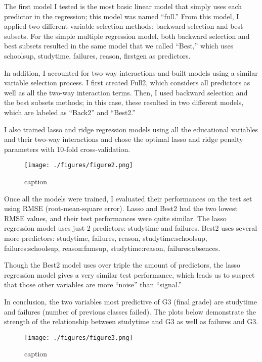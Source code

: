 \documentclass[
]{article}
\begin{document}
The first model I tested is the most basic linear model that simply uses
each predictor in the regression; this model was named ``full.'' From
this model, I applied two different variable selection methods: backward
selection and best subsets. For the simple multiple regression model,
both backward selection and best subsets resulted in the same model that
we called ``Best,'' which uses schoolsup, studytime, failures, reason,
firstgen as predictors.

In addition, I accounted for two-way interactions and built models using
a similar variable selection process. I first created Full2, which
considers all predictors as well as all the two-way interaction terms.
Then, I used backward selection and the best subsets methods; in this
case, these resulted in two different models, which are labeled as
``Back2'' and ``Best2.''

I also trained lasso and ridge regression models using all the
educational variables and their two-way interactions and chose the
optimal lasso and ridge penalty parameters with 10-fold
cross-validation.

\begin{figure}
\centering
\texttt{[image: ./figures/figure2.png]}
\caption{caption}
\end{figure}

Once all the models were trained, I evaluated their performances on the
test set using RMSE (root-mean-square error). Lasso and Best2 had the
two lowest RMSE values, and their test performances were quite similar.
The lasso regression model uses just 2 predictors: studytime and
failures. Best2 uses several more predictors: studytime, failures,
reason, studytime:schoolsup, failures:schoolsup, reason:famsup,
studytime:reason, failures:absences.

Though the Best2 model uses over triple the amount of predictors, the
lasso regression model gives a very similar test performance, which
leads us to suspect that those other variables are more ``noise'' than
``signal.''

In conclusion, the two variables most predictive of G3 (final grade) are
studytime and failures (number of previous classes failed). The plots
below demonstrate the strength of the relationship between studytime and
G3 as well as failures and G3.

\begin{figure}
\centering
\texttt{[image: ./figures/figure3.png]}
\caption{caption}
\end{figure}
\end{document}

